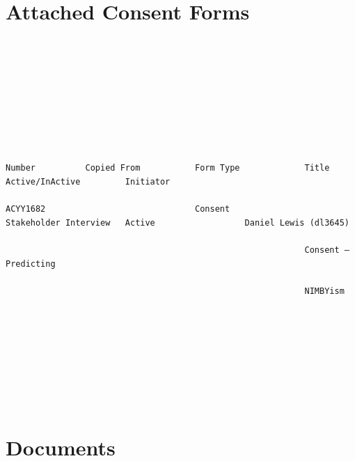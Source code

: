 \documentclass[10pt, letterpaper]{article}
\begin{document}
\vspace{0.5em}

\section*{Attached Consent Forms}

{\footnotesize

\begin{verbatim}









Number          Copied From           Form Type             Title                   Active/InActive         Initiator

ACYY1682                              Consent               Stakeholder Interview   Active                  Daniel Lewis (dl3645)

                                                            Consent – Predicting

                                                            NIMBYism









\end{verbatim}

}

\section*{Documents}
\end{document}
